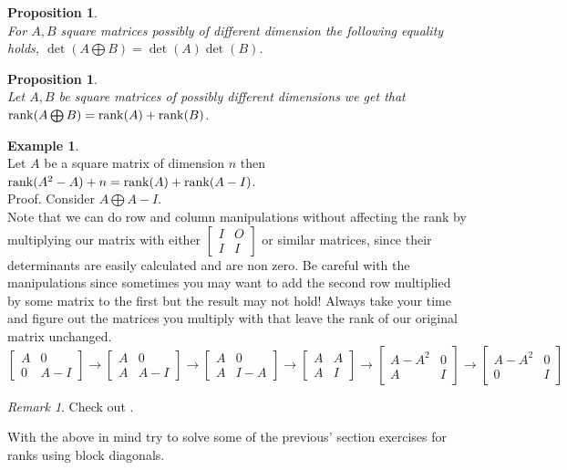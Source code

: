 \documentclass[12pt]{article}
\newtheorem{prop}[theorem]{Proposition}
\theoremstyle{definition}
\newtheorem*{example}{Example}
\theoremstyle{remark}
\newtheorem*{remark}{Remark}
\theoremstyle{plain}
\begin{document}
\begin{prop}\leavevmode \\
 For $A,B$ square matrices possibly of different dimension the following equality holds, $\det(A\bigoplus B)=\det(A)\det(B)$.
\end{prop}
\begin{prop}\leavevmode \\
Let $A,B$ be square matrices of possibly different dimensions we get that $\rank(A\bigoplus B)=\rank(A)+\rank(B)$.
\end{prop}
\begin{example}\leavevmode \\
Let $A$ be a square matrix of dimension $n$ then $\rank(A^2-A)+n=\rank(A)+\rank(A-I)$.\\
Proof. Consider $A\bigoplus A-I$.\\
Note that we can do row and column manipulations without affecting the rank by multiplying our matrix with either $\begin{bmatrix} I & O\\
	I & I
\end{bmatrix}$ or similar matrices, since their determinants are easily calculated and are non zero. Be careful with the manipulations since sometimes you may want to add the second row multiplied by some matrix to the first but the result may not hold! Always take your time and figure out the matrices you multiply with that leave the rank of our original matrix unchanged.
$$\begin{bmatrix}
A & 0\\
0 & A-I
\end{bmatrix}\to
\begin{bmatrix}
A & 0\\
A & A-I
\end{bmatrix}\to 
\begin{bmatrix}
A & 0\\
A & I-A
\end{bmatrix}\to
\begin{bmatrix}
A & A\\
A & I
\end{bmatrix}\to
\begin{bmatrix}
A-A^2 & 0\\
A & I
\end{bmatrix}\to
\begin{bmatrix}
A-A^2 & 0\\
0 & I
\end{bmatrix}
$$ 

\end{example}
\begin{remark}
    Check out \cite{Pop2020}.
\end{remark}
With the above in mind try to solve some of the previous' section exercises for ranks using block diagonals.
\end{document}
